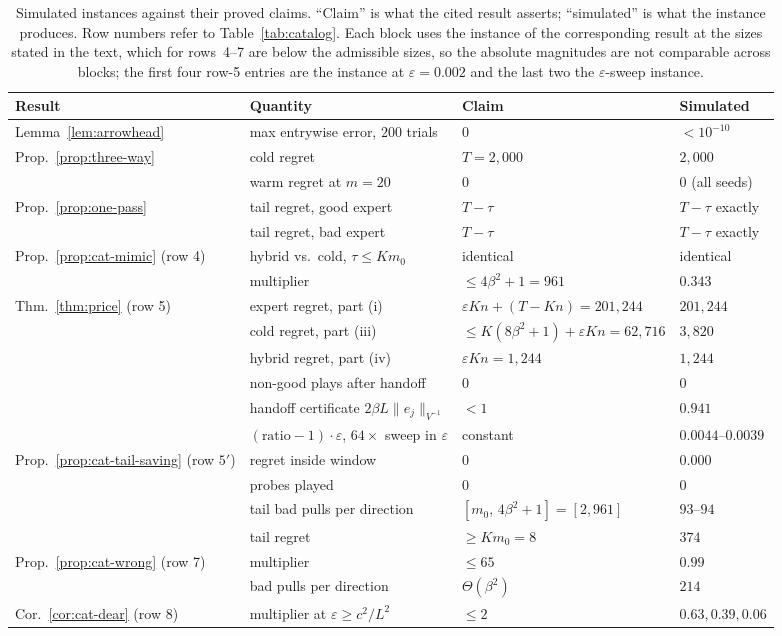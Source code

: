 \documentclass{article}
\theoremstyle{definition}
\theoremstyle{remark}
\newcommand{\eps}{\varepsilon}
\theoremstyle{remark}
\begin{document}
\begin{table}[h]
\centering
\caption{Simulated instances against their proved claims. ``Claim'' is what
the cited result asserts; ``simulated'' is what the instance produces. Row
numbers refer to Table~\ref{tab:catalog}. Each block uses the instance of the
corresponding result at the sizes stated in the text, which for rows~4--7 are
below the admissible sizes, so the absolute magnitudes are
not comparable across blocks; the first four row-5 entries are the instance at
$\eps=0.002$ and the last two the $\eps$-sweep instance.}
\label{tab:synthetic}
\small
\setlength{\tabcolsep}{4pt}
\begin{tabular}{@{}llll@{}}
\toprule
Result & Quantity & Claim & Simulated \\
\midrule
Lemma~\ref{lem:arrowhead} & max entrywise error, $200$ trials & $0$ & $<10^{-10}$ \\
\midrule
Prop.~\ref{prop:three-way} & cold regret & $T=2{,}000$ & $2{,}000$ \\
 & warm regret at $m=20$ & $0$ & $0$ (all seeds) \\
Prop.~\ref{prop:one-pass} & tail regret, good expert & $T-\tau$ & $T-\tau$ exactly \\
 & tail regret, bad expert & $T-\tau$ & $T-\tau$ exactly \\
\midrule
Prop.~\ref{prop:cat-mimic} (row 4) & hybrid vs.\ cold, $\tau\le Km_0$ & identical & identical \\
 & multiplier & $\le4\beta^2+1=961$ & $0.343$ \\
\midrule
Thm.~\ref{thm:price} (row 5) & expert regret, part (i) & $\eps Kn+(T{-}Kn)=201{,}244$ & $201{,}244$ \\
 & cold regret, part (iii) & $\le K(8\beta^2{+}1)+\eps Kn=62{,}716$ & $3{,}820$ \\
 & hybrid regret, part (iv) & $\eps Kn=1{,}244$ & $1{,}244$ \\
 & non-good plays after handoff & $0$ & $0$ \\
 & handoff certificate $2\beta L\|e_j\|_{V^{-1}}$ & $<1$ & $0.941$ \\
 & $(\text{ratio}-1)\cdot\eps$, $64\times$ sweep in $\eps$ & constant & $0.0044$--$0.0039$ \\
\midrule
Prop.~\ref{prop:cat-tail-saving} (row $5'$) & regret inside window & $0$ & $0.000$ \\
 & probes played & $0$ & $0$ \\
 & tail bad pulls per direction & $[m_0,\,4\beta^2{+}1]=[2,961]$ & $93$--$94$ \\
 & tail regret & $\ge Km_0=8$ & $374$ \\
\midrule
Prop.~\ref{prop:cat-wrong} (row 7) & multiplier & $\le65$ & $0.99$ \\
 & bad pulls per direction & $\Theta(\beta^2)$ & $214$ \\
\midrule
Cor.~\ref{cor:cat-dear} (row 8) & multiplier at $\eps\ge c^2/L^2$ & $\le2$ & $0.63,0.39,0.06$ \\
\bottomrule
\end{tabular}
\end{table}
\end{document}
